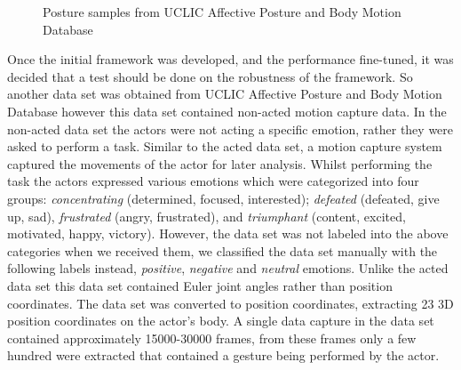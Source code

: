 \documentclass[]{report}   %
\begin{document}
\begin{figure}[htbp]
  \centering
  \hfill
  \hfill
  \caption{Posture samples from UCLIC Affective Posture and Body Motion Database\cite{Kleinsmith:2006:CDR:1221613.1222203}}
  \label{fig:aff1}
\end{figure}

Once the initial framework was developed, and the performance fine-tuned, it was decided that a test should be done on the robustness of the framework. So another data set was obtained from UCLIC Affective Posture and Body Motion Database however this data set contained non-acted\cite{KlEINSMITH_Bianchi-Berthouze_Steed_2011} motion capture data. In the non-acted data set the actors were not acting a specific emotion, rather they were asked to perform a task. Similar to the acted data set, a motion capture system captured the movements of the actor for later analysis. Whilst performing the task the actors expressed various emotions which were categorized into four groups\cite{KlEINSMITH_Bianchi-Berthouze_Steed_2011}: \textit{concentrating} (determined, focused, interested); \textit{defeated} (defeated, give up, sad), \textit{frustrated} (angry, frustrated), and \textit{triumphant} (content, excited, motivated, happy, victory).  However, the data set was not labeled into the above categories when we received them, we classified the data set manually with the following labels instead, \textit{positive}, \textit{negative} and \textit{neutral} emotions. Unlike the acted data set this data set contained Euler joint angles rather than position coordinates. The data set was converted to position coordinates, extracting 23 3D position coordinates on the actor's body. A single data capture in the data set contained approximately 15000-30000 frames, from these frames only a few hundred were extracted that contained a gesture being performed by the actor.
\end{document}
